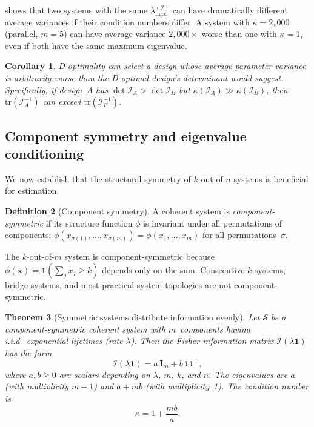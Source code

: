 \documentclass[12pt]{article}
\newtheorem{theorem}{Theorem}
\newtheorem{corollary}[theorem]{Corollary}
\theoremstyle{definition}
\newtheorem{definition}[theorem]{Definition}
\theoremstyle{remark}
\newcommand{\tr}{\mathrm{tr}}
\newcommand{\bone}{\mathbf{1}}
\begin{document}
 shows that two systems with the same
$\lambda_{\max}^{(\mathcal{I})}$ can have dramatically different
average variances if their condition numbers differ.  A system with
$\kappa = 2{,}000$ (parallel, $m = 5$) can have average variance
$2{,}000\times$ worse than one with $\kappa = 1$, even if both have
the same maximum eigenvalue.

\begin{corollary}
  \label{cor:doptfail}
  D-optimality can select a design whose average parameter variance is
  arbitrarily worse than the D-optimal design's determinant would
  suggest.  Specifically, if design~$A$ has
  $\det \mathcal{I}_A > \det \mathcal{I}_B$ but
  $\kappa(\mathcal{I}_A) \gg \kappa(\mathcal{I}_B)$, then
  $\tr(\mathcal{I}_A^{-1})$ can exceed
  $\tr(\mathcal{I}_B^{-1})$.
\end{corollary}


\subsection{Component symmetry and eigenvalue conditioning}
\label{sec:symmetry}

We now establish that the structural symmetry of $k$-out-of-$n$
systems is beneficial for estimation.

\begin{definition}[Component symmetry]
  \label{def:compsym}
  A coherent system is \emph{component-symmetric} if its structure
  function $\phi$ is invariant under all permutations of components:
  $\phi(x_{\sigma(1)}, \ldots, x_{\sigma(m)}) = \phi(x_1, \ldots, x_m)$
  for all permutations~$\sigma$.
\end{definition}

The $k$-out-of-$m$ system is component-symmetric because
$\phi(\mathbf{x}) = \mathbf{1}(\sum_j x_j \ge k)$ depends only on
the sum.  Consecutive-$k$ systems, bridge systems, and most practical
system topologies are not component-symmetric.

\begin{theorem}[Symmetric systems distribute information evenly]
  \label{thm:symmetry}
  Let $\mathcal{S}$ be a component-symmetric coherent system with
  $m$~components having i.i.d.\ exponential lifetimes (rate
  $\lambda$).  Then the Fisher information matrix
  $\mathcal{I}(\lambda \bone)$ has the form
  \begin{equation}
    \label{eq:symI}
    \mathcal{I}(\lambda \bone) = a \, \mathbf{I}_m + b \, \bone\bone^\top,
  \end{equation}
  where $a, b \ge 0$ are scalars depending on $\lambda$, $m$, $k$,
  and $n$.  The eigenvalues are $a$ (with multiplicity $m - 1$) and
  $a + mb$ (with multiplicity~1).  The condition number is
  \begin{equation}
    \label{eq:symkappa}
    \kappa = 1 + \frac{mb}{a}.
  \end{equation}
\end{theorem}
\end{document}
